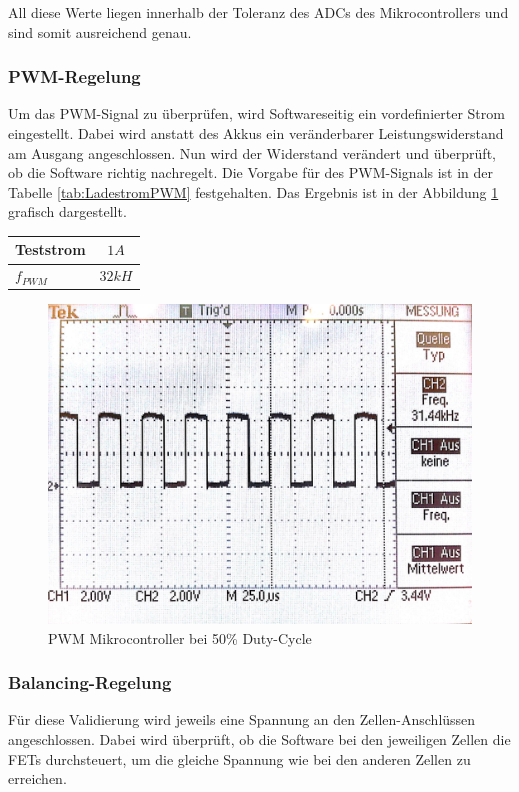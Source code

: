 All diese Werte liegen innerhalb der Toleranz des ADCs des Mikrocontrollers und sind somit ausreichend genau.

\subsubsection*{PWM-Regelung}
Um das PWM-Signal zu überprüfen, wird Softwareseitig ein vordefinierter Strom eingestellt. Dabei wird anstatt des Akkus ein veränderbarer Leistungswiderstand am Ausgang angeschlossen. Nun wird der Widerstand verändert und überprüft, ob die Software richtig nachregelt. Die Vorgabe für des PWM-Signals ist in der Tabelle \ref{tab:LadestromPWM} festgehalten. Das Ergebnis ist in der Abbildung \ref{fig:PWM_uC} grafisch dargestellt.
\begin{center}
	\begin{tabular}{l|c}
		\hline 
		Teststrom & $1A$ \\ \hline
		${f}_{PWM}$ & $32kH$ \\ \hline
	\end{tabular} 
	\label{tab:LadestromPWM}
\end{center}

\begin{figure} [H]
	\centering
	\includegraphics[width=0.5\linewidth]{images/PWM.jpg}
	\caption{PWM Mikrocontroller bei 50\% Duty-Cycle}
	\label{fig:PWM_uC}
\end{figure}

\subsubsection{Balancing-Regelung}
Für diese Validierung wird jeweils eine Spannung an den Zellen-Anschlüssen angeschlossen. Dabei wird überprüft, ob die Software bei den jeweiligen Zellen die FETs durchsteuert, um  die gleiche Spannung wie bei den anderen Zellen zu erreichen.


